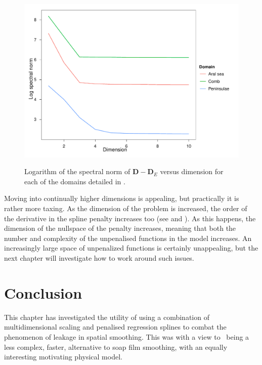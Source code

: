 \begin{figure}
\centering
\includegraphics[width=\textwidth]{mds/figs/eigenplot.pdf} \\
\caption{Logarithm of the spectral norm of $\mathbf{D}-\mathbf{D}_E$ versus dimension for each of the domains detailed in .}
\label{increasek}
\end{figure}



Moving into continually higher dimensions is appealing, but practically it is rather more taxing. As the dimension of the problem is increased, the order of the derivative in the spline penalty increases too (see  and ). As this happens, the dimension of the nullspace of the penalty increases, meaning that both the number and complexity of the unpenalised functions in the model increases. An increasingly large space of unpenalized functions is certainly unappealing, but the next chapter will investigate how to work around such issues.

\section{Conclusion}
\label{mds-conc}

This chapter has investigated the utility of using a combination of multidimensional scaling and penalised regression splines to combat the phenomenon of leakage in spatial smoothing. This was with a view to \mdsap\ being a less complex, faster, alternative to soap film smoothing, with an equally interesting motivating physical model.

